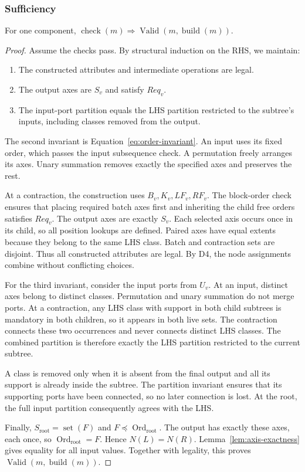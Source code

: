\subsubsection{Sufficiency}
\begin{lemma}[Sufficiency]
\label{lem:sufficiency}
For one component,
$\operatorname{check}(m)\Rightarrow
\operatorname{Valid}(m,\operatorname{build}(m))$.
\end{lemma}
\begin{proof}
Assume the checks pass. By structural induction on the RHS, we maintain:
\begin{enumerate}
\item The constructed attributes and intermediate operations are legal.
\item The output axes are $S_v$ and satisfy $Req_v$.
\item The input-port partition equals the LHS partition restricted to
the subtree's inputs, including classes removed from the output.
\end{enumerate}
The second invariant is Equation~\eqref{eq:order-invariant}.
An input uses its fixed order, which passes the input subsequence check.
A permutation freely arranges its axes. Unary summation removes exactly
the specified axes and preserves the rest.

At a contraction, the construction uses $B_v,K_v,LF_v,RF_v$.
The block-order check ensures that placing required batch axes first and
inheriting the child free orders satisfies $Req_v$. The output axes are
exactly $S_v$. Each selected axis occurs once in its child, so all position
lookups are defined. Paired axes have equal extents because they belong to
the same LHS class. Batch and contraction sets are disjoint. Thus all
constructed attributes are legal.
By D4, the node assignments combine without conflicting choices.

For the third invariant, consider the input ports from $U_v$.
At an input, distinct axes belong to distinct classes. Permutation and
unary summation do not merge ports. At a contraction, any LHS class with
support in both child subtrees is mandatory in both children, so it appears
in both live sets. The contraction connects these two occurrences and never
connects distinct LHS classes. The combined partition is therefore exactly
the LHS partition restricted to the current subtree.

A class is removed only when it is absent from the final output and all its
support is already inside the subtree. The partition invariant ensures that
its supporting ports have been connected, so no later connection is lost.
At the root, the full input partition consequently agrees with the LHS.

Finally, $S_{\mathrm{root}}=\operatorname{set}(F)$ and
$F\preceq\operatorname{Ord}_{\mathrm{root}}$. The output has exactly these
axes, each once, so $\operatorname{Ord}_{\mathrm{root}}=F$. Hence
$N(L)=N(R)$. Lemma~\ref{lem:axis-exactness} gives equality for all input
values. Together with legality, this proves
$\operatorname{Valid}(m,\operatorname{build}(m))$.
\end{proof}

